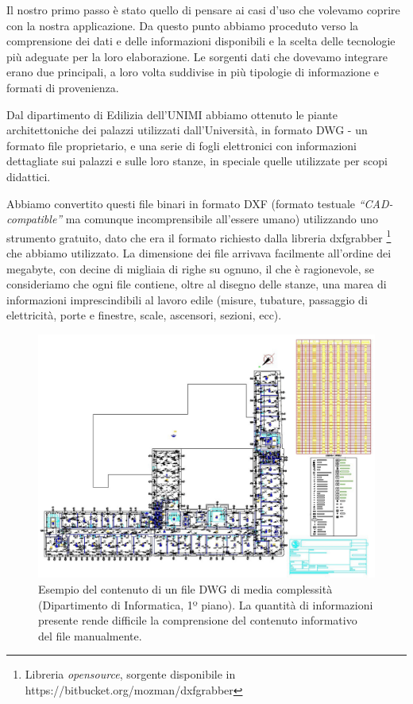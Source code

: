 \documentclass[12pt]{report}
\begin{document}
Il nostro primo passo è stato quello di pensare ai casi d'uso che
volevamo coprire con la nostra applicazione. Da questo punto abbiamo
proceduto verso la comprensione dei dati e delle informazioni
disponibili e la scelta delle tecnologie più adeguate per la loro
elaborazione. Le sorgenti dati che dovevamo integrare erano due
principali, a loro volta suddivise in più tipologie di informazione e
formati di provenienza.

Dal dipartimento di Edilizia dell'UNIMI abbiamo ottenuto le piante
architettoniche dei palazzi utilizzati dall'Università, in formato DWG
- un formato file proprietario, e una serie di fogli elettronici con
informazioni dettagliate sui palazzi e sulle loro stanze, in speciale
quelle utilizzate per scopi didattici.

Abbiamo convertito questi file binari in formato DXF (formato testuale
\textit{``CAD-compatible''} ma comunque incomprensibile all'essere
umano) utilizzando uno strumento gratuito, dato che era il formato
richiesto dalla libreria dxfgrabber \footnote{Libreria \textit{opensource},
sorgente disponibile in https://bitbucket.org/mozman/dxfgrabber} che abbiamo
utilizzato. La dimensione dei file arrivava facilmente all'ordine dei
megabyte, con decine di migliaia di righe su ognuno, il che è ragionevole, se
consideriamo che ogni file contiene, oltre al disegno delle stanze, una marea
di informazioni imprescindibili al lavoro edile (misure, tubature, passaggio
di elettricità, porte e finestre, scale, ascensori, sezioni, ecc).

\begin{figure}[h]
    \centering
    \includegraphics[width=\textwidth]{03-dxf-chaos.jpg}
    \caption{Esempio del contenuto di un file DWG di media complessità
(Dipartimento di Informatica, 1º piano). La quantità di informazioni
presente rende difficile la comprensione del contenuto informativo
del file manualmente. }
    \label{fig:dxf_chaos}
\end{figure}
\end{document}
